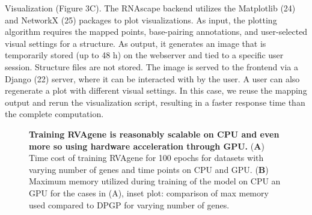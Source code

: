 Visualization (Figure 3C). The RNAscape backend utilizes the Matplotlib (24) and NetworkX (25) packages to plot visualizations. As input, the plotting algorithm requires the mapped points, base-pairing annotations, and user-selected visual settings for a structure. As output, it generates an image that is temporarily stored (up to 48 h) on the webserver and tied to a specific user session. Structure files are not stored. The image is served to the frontend via a Django (22) server, where it can be interacted with by the user. A user can also regenerate a plot with different visual settings. In this case, we reuse the mapping output and rerun the visualization script, resulting in a faster response time than the complete computation.
\begin{center}
    \begin{figure}
        \caption[Computational cost of training RVAgene]{\textbf{Training RVAgene is reasonably scalable on CPU and even more so using hardware acceleration through GPU.} ({\bf A}) Time cost of training RVAgene for 100 epochs for datasets with varying number of genes and time points on CPU and GPU. ({\bf B}) Maximum memory utilized during training of the model on CPU an GPU for the cases in (A), inset plot: comparison of max memory used compared to DPGP for varying number of genes.}
  \label{fig:rnascape2}
\end{figure}
\end{center}
